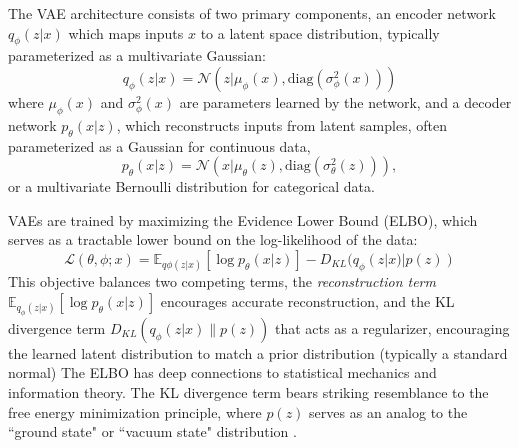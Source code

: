         The VAE architecture consists of two primary components, an encoder network \(q_{\phi}(z|x)\) which maps inputs \(x\) to a latent space distribution, typically parameterized as a multivariate Gaussian:
        \begin{equation}
        q_{\phi}(z|x) = \mathcal{N}(z|\mu_{\phi}(x), \text{diag}(\sigma^2_{\phi}(x)))
        \end{equation}
        where \(\mu_{\phi}(x)\) and \(\sigma^2_{\phi}(x)\) are parameters learned by the network, and a  decoder network \(p_{\theta}(x|z)\), which reconstructs inputs from latent samples, often parameterized as a Gaussian for continuous data,
        \begin{equation}
            p_{\theta}(x|z) = \mathcal{N}(x|\mu_{\theta}(z), \text{diag}(\sigma^2_{\theta}(z))),
        \end{equation}
        or a multivariate Bernoulli distribution for categorical data.

        VAEs are trained by maximizing the Evidence Lower Bound (ELBO), which serves as a tractable lower bound on the log-likelihood of the data:
        \begin{equation}
            \mathcal{L}(\theta, \phi; x) = \mathbb{E}_{q{\phi}(z|x)}[\log p_{\theta}(x|z)] - D_{KL}(q_{\phi}(z|x) | p(z))
        \end{equation}
        This objective balances two competing terms, the \emph{reconstruction term} \(\mathbb{E}_{q_{\phi}(z|x)}[\log p_{\theta}(x|z)]\) encourages accurate reconstruction, and the KL divergence term \(D_{KL}(q_{\phi}(z|x) \| p(z))\) that acts as a regularizer, encouraging the learned latent distribution to match a prior distribution (typically a standard normal)
        The ELBO has deep connections to statistical mechanics and information theory.
        The KL divergence term bears striking resemblance to the free energy minimization principle, where \(p(z)\) serves as an analog to the ``ground state" or ``vacuum state" distribution .

